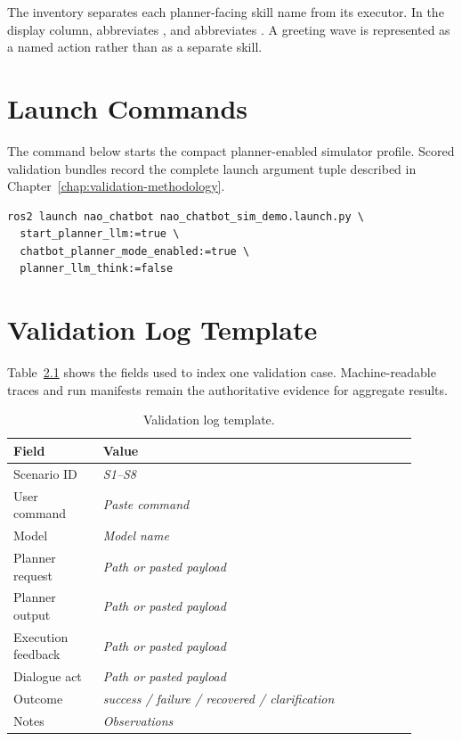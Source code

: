 The inventory separates each planner-facing skill name from its executor. In the display column,  abbreviates , and  abbreviates . A greeting wave is represented as a named  action rather than as a separate skill.

\chapter{Launch Commands}

The command below starts the compact planner-enabled simulator profile. Scored validation bundles record the complete launch argument tuple described in Chapter~\ref{chap:validation-methodology}.

\begin{lstlisting}[style=sharedCode]
ros2 launch nao_chatbot nao_chatbot_sim_demo.launch.py \
  start_planner_llm:=true \
  chatbot_planner_mode_enabled:=true \
  planner_llm_think:=false
\end{lstlisting}

\chapter{Validation Log Template}

Table~\ref{tab:validation-log-template} shows the fields used to index one validation case. Machine-readable traces and run manifests remain the authoritative evidence for aggregate results.

\begin{table}[H]
\centering
\begin{tabular}{p{0.20\linewidth}p{0.70\linewidth}}
\toprule
\textbf{Field} & \textbf{Value}\\
\midrule
Scenario ID & \textit{S1--S8}\\
User command & \textit{Paste command}\\
Model & \textit{Model name}\\
Planner request & \textit{Path or pasted payload}\\
Planner output & \textit{Path or pasted payload}\\
Execution feedback & \textit{Path or pasted payload}\\
Dialogue act & \textit{Path or pasted payload}\\
Outcome & \textit{success / failure / recovered / clarification}\\
Notes & \textit{Observations}\\
\bottomrule
\end{tabular}
\caption{Validation log template.}
\label{tab:validation-log-template}
\end{table}

